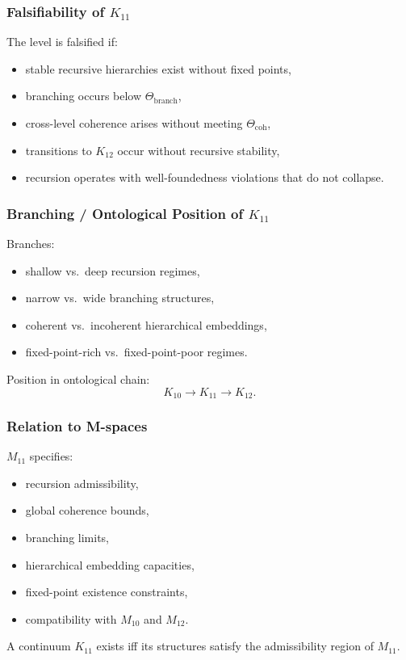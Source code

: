 \subsubsection{Falsifiability of $K_{11}$}

The level is falsified if:
\begin{itemize}
    \item stable recursive hierarchies exist without fixed points,
    \item branching occurs below $\Theta_{\mathrm{branch}}$,
    \item cross-level coherence arises without meeting $\Theta_{\mathrm{coh}}$,
    \item transitions to $K_{12}$ occur without recursive stability,
    \item recursion operates with well-foundedness violations that do not collapse.
\end{itemize}

\subsubsection{Branching / Ontological Position of $K_{11}$}

Branches:
\begin{itemize}
    \item shallow vs.\ deep recursion regimes,
    \item narrow vs.\ wide branching structures,
    \item coherent vs.\ incoherent hierarchical embeddings,
    \item fixed-point-rich vs.\ fixed-point-poor regimes.
\end{itemize}

Position in ontological chain:
\[
K_{10} \to K_{11} \to K_{12}.
\]

\subsubsection{Relation to M-spaces}

$M_{11}$ specifies:
\begin{itemize}
    \item recursion admissibility,
    \item global coherence bounds,
    \item branching limits,
    \item hierarchical embedding capacities,
    \item fixed-point existence constraints,
    \item compatibility with $M_{10}$ and $M_{12}$.
\end{itemize}

A continuum $K_{11}$ exists iff its structures satisfy the admissibility region of $M_{11}$.
